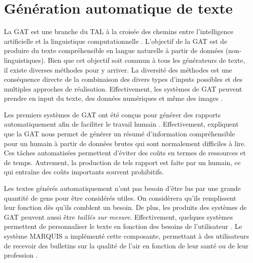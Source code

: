 
\chapter{Génération automatique de texte}


La \acf{GAT} est une branche du \acf{TAL} à la croisée des chemins entre l'intelligence artificielle et la linguistique computationnelle \citep{ReiterBuildingNaturalLanguage2000}. L'objectif de la \ac{GAT} est de produire du texte compréhensible en langue naturelle à partir de données (non-linguistiques). Bien que cet objectif soit commun à tous les générateurs de texte, il existe diverses méthodes pour y arriver. La diversité des méthodes est une conséquence directe de la combinaison des divers types d'inputs possibles et des multiples approches de réalisation. Effectivement, les systèmes de \ac{GAT} peuvent prendre en input du texte, des données numériques et même des images \citep{thomason:coling14}.

Les premiers systèmes de \ac{GAT} ont été conçus pour générer des rapports automatiquement afin de faciliter le travail humain \citep{ReiterBuildingNaturalLanguage2000}. Effectivement, \cite{DaoustJSREALTextRealizer2015} expliquent que la \ac{GAT} nous permet de générer un résumé d'information compréhensible pour un humain à partir de données brutes qui sont normalement difficiles à lire. Ces tâches automatisées permettent d'éviter des coûts en termes de ressources et de temps. Autrement, la production de tels rapport est faite par un humain, ce qui entraîne des coûts importants souvent prohibitifs.

Les textes générés automatiquement n'ont pas besoin d'être lus par une grande quantité de gens pour être considérés utiles. On considèrera qu'ils remplissent leur fonction dès qu'ils comblent un besoin. De plus, les produits des systèmes de \ac{GAT} peuvent aussi être \emph{taillés sur mesure}. Effectivement, quelques systèmes permettent de personnaliser le texte en fonction des besoins de l'utilisateur \citep{1948c0b7a8ca42679cad977bb2cdddc2}. Le système MARQUIS a implémenté cette composante, permettant à des utilisateurs de recevoir des bulletins sur la qualité de l'air en fonction de leur santé ou de leur profession \citep{WannerMARQUISGENERATIONUSERTAILORED2010}.

